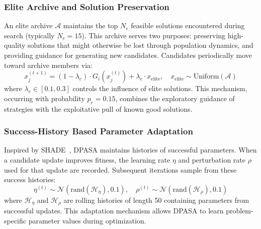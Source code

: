 \documentclass[11pt]{article}
\begin{document}
\subsubsection{Elite Archive and Solution Preservation}
An elite archive $\mathcal{A}$ maintains the top $N_e$ feasible solutions encountered during search (typically $N_e = 15$). This archive serves two purposes: preserving high-quality solutions that might otherwise be lost through population dynamics, and providing guidance for generating new candidates. Candidates periodically move toward archive members via:
\begin{equation}
x_j^{(t+1)} = (1-\lambda_e) \cdot G_i(x_j^{(t)}) + \lambda_e \cdot x_{\text{elite}}, \quad x_{\text{elite}} \sim \text{Uniform}(\mathcal{A})
\end{equation}
where $\lambda_e \in [0.1, 0.3]$ controls the influence of elite solutions. This mechanism, occurring with probability $p_e = 0.15$, combines the exploratory guidance of strategies with the exploitative pull of known good solutions.

\subsubsection{Success-History Based Parameter Adaptation}
Inspired by SHADE~\citep{tanabe2013shade}, DPASA maintains histories of successful parameters. When a candidate update improves fitness, the learning rate $\eta$ and perturbation rate $\rho$ used for that update are recorded. Subsequent iterations sample from these success histories:
\begin{equation}
\eta^{(t)} \sim \mathcal{N}\left(\text{rand}(\mathcal{H}_\eta), 0.1\right), \quad \rho^{(t)} \sim \mathcal{N}\left(\text{rand}(\mathcal{H}_\rho), 0.1\right)
\end{equation}
where $\mathcal{H}_\eta$ and $\mathcal{H}_\rho$ are rolling histories of length 50 containing parameters from successful updates. This adaptation mechanism allows DPASA to learn problem-specific parameter values during optimization.
\end{document}
